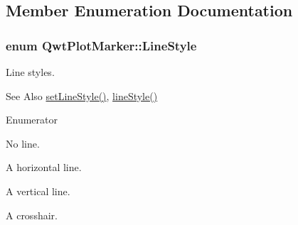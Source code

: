 \subsection{Member Enumeration Documentation}
\hypertarget{class_qwt_plot_marker_a297efa835423bfa5a870bbc8ff1c623b}{
\subsubsection[{Line\-Style}]{\setlength{\rightskip}{0pt plus 5cm}enum {\bf Qwt\-Plot\-Marker\-::\-Line\-Style}}}\label{class_qwt_plot_marker_a297efa835423bfa5a870bbc8ff1c623b}
Line styles. \begin{DoxySeeAlso}{See Also}
\hyperlink{class_qwt_plot_marker_ae4533f9f9f5a7dfbc85729215d4b5932}{set\-Line\-Style()}, \hyperlink{class_qwt_plot_marker_a9afac9382c6e482ea0181048b155e287}{line\-Style()} 
\end{DoxySeeAlso}
\begin{Desc}
\item[Enumerator]\par
\begin{description}
\item[{\em 
\hypertarget{class_qwt_plot_marker_a297efa835423bfa5a870bbc8ff1c623ba5407403ea223539c7cac264a9fff5fe0}{No\-Line}\label{class_qwt_plot_marker_a297efa835423bfa5a870bbc8ff1c623ba5407403ea223539c7cac264a9fff5fe0}
}]No line. \item[{\em 
\hypertarget{class_qwt_plot_marker_a297efa835423bfa5a870bbc8ff1c623ba4439b2f358352a4cf6414b0ea4861609}{H\-Line}\label{class_qwt_plot_marker_a297efa835423bfa5a870bbc8ff1c623ba4439b2f358352a4cf6414b0ea4861609}
}]A horizontal line. \item[{\em 
\hypertarget{class_qwt_plot_marker_a297efa835423bfa5a870bbc8ff1c623ba55ab75371699cd7c0e55c494da6454dc}{V\-Line}\label{class_qwt_plot_marker_a297efa835423bfa5a870bbc8ff1c623ba55ab75371699cd7c0e55c494da6454dc}
}]A vertical line. \item[{\em 
\hypertarget{class_qwt_plot_marker_a297efa835423bfa5a870bbc8ff1c623ba5014eec17204ed4b0cec35e7322696d2}{Cross}\label{class_qwt_plot_marker_a297efa835423bfa5a870bbc8ff1c623ba5014eec17204ed4b0cec35e7322696d2}
}]A crosshair. \end{description}
\end{Desc}


